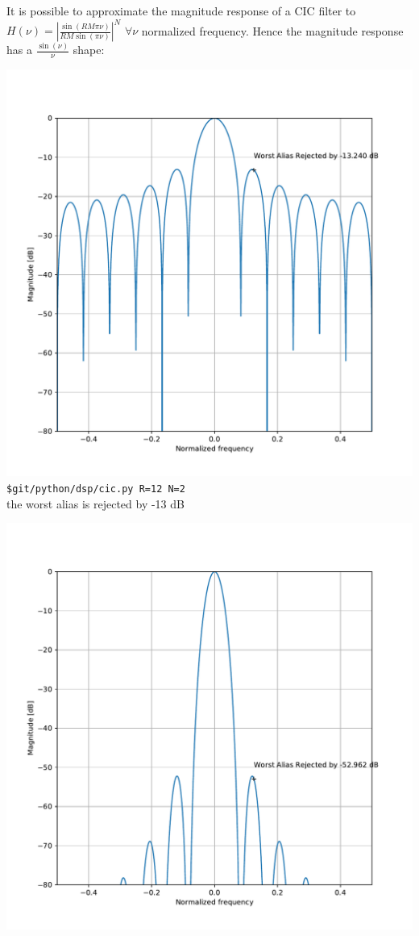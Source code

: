 \documentclass{article}
\begin{document}
It is possible to approximate the magnitude response 
of a CIC filter to
$H(\nu) = \left| \frac{\sin(R M \pi \nu)}{R M \sin(\pi \nu)} \right|^N$
$\forall \nu$ normalized frequency. 
Hence the magnitude response has a $\frac{\sin(\nu)}{\nu}$ shape:

\begin{center}
	\begin{minipage}{0.40\linewidth}
		\includegraphics[width=0.99\linewidth]{cic_r12_n2.pdf} \\
		{\tt \$git/python/dsp/cic.py R=12 N=2} \\
		the worst alias is rejected by -13 dB
	\end{minipage}
	\begin{minipage}{0.40\linewidth}
		\includegraphics[width=0.99\linewidth]{cic_r12_n8.pdf} \\

\end{minipage}
\end{center}
\end{document}
